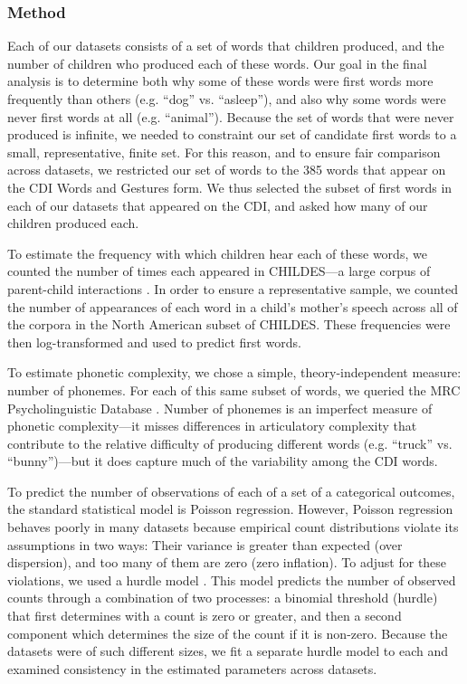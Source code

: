 \documentclass[10pt,letterpaper]{article}
\begin{document}
\subsubsection{Method}

Each of our datasets consists of a set of words that children produced, and the number of children who produced each of these words. Our goal in the final analysis is to determine both why some of these words were first words more frequently than others (e.g. ``dog'' vs. ``asleep''), and also why some words were never first words at all (e.g. ``animal''). Because the set of words that were never produced is infinite, we needed to constraint our set of candidate first words to a small, representative, finite set. For this reason, and to ensure fair comparison across datasets, we restricted our set of words to the 385 words that appear on the CDI Words and Gestures form. We thus selected the subset of first words in each of our datasets that appeared on the CDI, and asked how many of our children produced each.

To estimate the frequency with which children hear each of these words, we counted the number of times each appeared in CHILDES---a large corpus of parent-child interactions \cite{macwhinney2000}. In order to ensure a representative sample, we counted the number of appearances of each word in a child's mother's speech across all of the corpora in the North American subset of CHILDES. These frequencies were then log-transformed and used to predict first words.

To estimate phonetic complexity, we chose a simple, theory-independent measure: number of phonemes. For each of this same subset of words, we queried the MRC Psycholinguistic Database \cite{Wilson1988}. Number of phonemes is an imperfect measure of phonetic complexity---it misses differences in articulatory complexity that contribute to the relative difficulty of producing different words (e.g. ``truck'' vs. ``bunny'')---but it does capture much of the variability among the CDI words.

To predict the number of observations of each of a set of a categorical outcomes, the standard statistical model is Poisson regression. However, Poisson regression behaves poorly in many datasets because empirical count distributions violate its assumptions in two ways: Their variance is greater than expected (over dispersion), and too many of them are zero (zero inflation). To adjust for these violations, we used a hurdle model \cite{mullahy1986}. This model predicts the number of observed counts through a combination of two processes: a binomial threshold (hurdle) that first determines with a count is zero or greater, and then a second component which determines the size of the count if it is non-zero. Because the datasets were of such different sizes, we fit a separate hurdle model to each and examined consistency in the estimated parameters across datasets.
\end{document}
